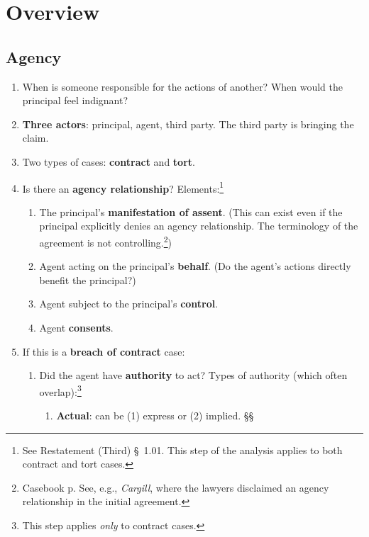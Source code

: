 \section{Overview}

\subsection{Agency}

\begin{enumerate}
    \item When is someone responsible for the actions of another? When would 
    the principal feel indignant?
    \item \textbf{Three actors}: principal, agent, third party. The third 
    party is bringing the claim.
    \item Two types of cases: \textbf{contract} and \textbf{tort}.
    \item Is there an \textbf{agency relationship}? Elements:\footnote{See 
    Restatement (Third) \S\ 1.01. This step of the analysis applies to both 
    contract and tort cases.}
    \begin{enumerate}
        \item The principal's \textbf{manifestation of assent}. (This can 
        exist even if the principal explicitly denies an agency relationship. 
        The terminology of the agreement is not controlling.\footnote{Casebook 
        p. See, e.g., \emph{Cargill}, where the lawyers disclaimed an agency 
        relationship in the initial agreement.})
        \item Agent acting on the principal's \textbf{behalf}. (Do the agent's 
        actions directly benefit the principal?)
        \item Agent subject to the principal's \textbf{control}.
        \item Agent \textbf{consents}.
    \end{enumerate}
    \item If this is a \textbf{breach of contract} case:
    \begin{enumerate}
        \item Did the agent have \textbf{authority} to act? Types of authority 
        (which often overlap):\footnote{This step applies \emph{only} to 
        contract cases.}
        \begin{enumerate}
            \item \textbf{Actual}: can be (1) express or (2) implied. \S\S\ 

\end{enumerate}
\end{enumerate}
\end{enumerate}
